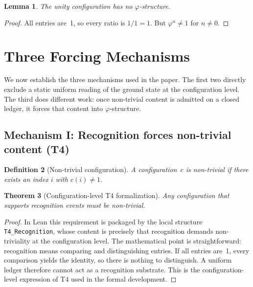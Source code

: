 \documentclass[11pt,a4paper]{article}
\newcommand{\phirs}{\varphi}
\newtheorem{theorem}{Theorem}[section]
\newtheorem{lemma}[theorem]{Lemma}
\newtheorem{definition}[theorem]{Definition}
\begin{document}
\begin{lemma}
\label{lem:unity_no_phi}
The unity configuration has no $\phirs$-structure.
\end{lemma}
\begin{proof}
All entries are~1, so every ratio is $1/1=1$.  But $\phirs^n\neq 1$ for $n\neq 0$.
\end{proof}

\section{Three Forcing Mechanisms}
\label{sec:forcing}

We now establish the three mechanisms used in the paper.  The first two directly exclude a static uniform reading of the ground state at the configuration level.  The third does different work: once non-trivial content is admitted on a closed ledger, it forces that content into $\phirs$-structure.

\subsection{Mechanism I: Recognition forces non-trivial content (T4)}

\begin{definition}[Non-trivial configuration]
A configuration~$c$ is \emph{non-trivial} if there exists an index $i$ with $c(i)\neq 1$.
\end{definition}

\begin{theorem}[Configuration-level T4 formalization]
\label{thm:T4}
Any configuration that supports recognition events must be non-trivial.
\end{theorem}
\begin{proof}
In Lean this requirement is packaged by the local structure \texttt{T4\_Recognition}, whose content is precisely that recognition demands non-triviality at the configuration level.  The mathematical point is straightforward: recognition means comparing and distinguishing entries.  If all entries are~1, every comparison yields the identity, so there is nothing to distinguish.  A uniform ledger therefore cannot act as a recognition substrate.  This is the configuration-level expression of T4 used in the formal development.
\end{proof}
\end{document}
